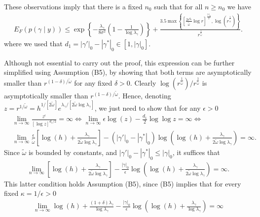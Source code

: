 These observations imply that there is a fixed $n_0$ such that for all $n \geq n_0$ we have
\begin{align}
 E_F (p(\gamma \mid y)) \leq  
 \exp \left\{ -\frac{\lambda_\gamma}{8\sigma^2} \left( 1 - \frac{1}{\log \lambda_\gamma} \right)\right\} +
\frac{3.5 \max \left\{ \left[ \frac{2 e^{q_0}}{\tilde{\omega}} \log r \right]^{\frac{|\gamma|_0}
{2}} , \log \left( r^{\frac{1}{\tilde{\omega}}} \right)  \right\}}{r^{\frac{1}{\tilde{\omega}}}}.
\label{seq:modelppbound_nonoverfitted3}
\end{align}
where we used that $d_1= |\gamma'|_0 - |\gamma^*|_0 \in [1, |\gamma|_0]$.

Although not essential to carry out the proof, this expression can be further simplified using Assumption (B5), by showing that both terms are asymptotically smaller than $r^{(1-\delta)/\tilde{\omega}}$ for any fixed $\delta>0$.
Clearly $\log(r^{\frac{1}{\tilde{\omega}}})/r^{\frac{1}{\tilde{\omega}}}$ is asymptotically smaller than $r^{(1-\delta)/\tilde{\omega}}$.
Hence, denoting $z= r^{1/\tilde{\omega}}= h^{1/[2\tilde{\omega}]} e^{\lambda_\gamma/[2 \tilde{\omega} \log \lambda_\gamma]}$, we just need to show that for any $\epsilon >0$
\begin{align}
&\lim_{n \rightarrow \infty} \frac{z^\epsilon}{[ \log z ]^{d_1/2}}= \infty
\Leftrightarrow
\lim_{n \rightarrow \infty} \epsilon \log(z) - \frac{d_1}{2} \log\log z= \infty
\Leftrightarrow
\nonumber \\
&\lim_{n \rightarrow \infty} \frac{\epsilon}{\tilde{\omega}} \left[\log(h) + \frac{\lambda_\gamma}{2 \tilde{\omega} \log \lambda_\gamma} \right]
- (|\gamma'|_0 - |\gamma^*|_0) \log \left( \log(h) + \frac{\lambda_\gamma}{2 \tilde{\omega} \log \lambda_\gamma} \right)= \infty.
\nonumber
\end{align}
Since $\tilde{\omega}$ is bounded by constants, and $|\gamma'|_0 - |\gamma^*|_0 \leq |\gamma|_0$, it suffices that
\begin{align}
 \lim_{n \rightarrow \infty} \left[\log(h) + \frac{\lambda_\gamma}{2 \tilde{\omega} \log \lambda_\gamma} \right]
- \frac{|\gamma|_0}{\epsilon} \log \left( \log(h) + \frac{\lambda_\gamma}{2 \tilde{\omega} \log \lambda_\gamma} \right)= \infty.
\nonumber
\end{align}
This latter condition holds Assumption (B5), since (B5) implies that for every fixed $\kappa = 1/\epsilon>0$ 
\begin{align}
\lim_{n \rightarrow \infty} \log(h) + \frac{(1+\delta) \lambda_\gamma}{\log \lambda_\gamma} - \frac{|\gamma|_0}{\epsilon} \log \left( \log(h) + \frac{\lambda_\gamma}{\log \lambda_\gamma} \right) = \infty
\nonumber
\end{align}

